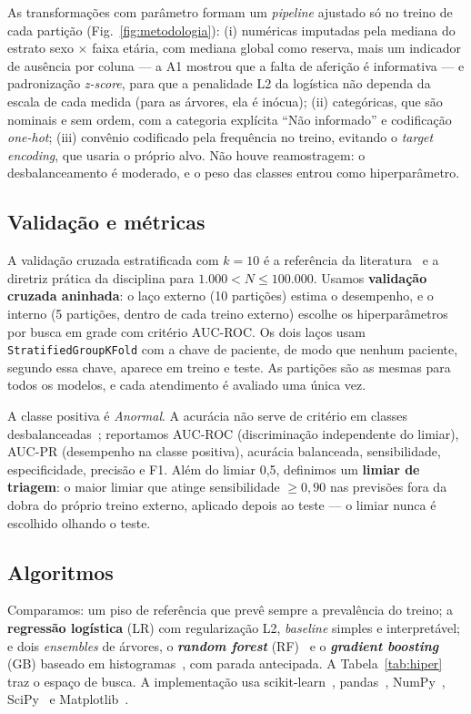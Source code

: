 \documentclass[conference,a4paper]{IEEEtran}
\begin{document}
As transformações com parâmetro formam um \textit{pipeline} ajustado só no treino de cada partição (Fig.~\ref{fig:metodologia}): (i) numéricas imputadas pela mediana do estrato sexo $\times$ faixa etária, com mediana global como reserva, mais um indicador de ausência por coluna --- a A1 mostrou que a falta de aferição é informativa --- e padronização \textit{z-score}, para que a penalidade L2 da logística não dependa da escala de cada medida (para as árvores, ela é inócua); (ii) categóricas, que são nominais e sem ordem, com a categoria explícita ``Não informado'' e codificação \textit{one-hot}; (iii) convênio codificado pela frequência no treino, evitando o \textit{target encoding}, que usaria o próprio alvo. Não houve reamostragem: o desbalanceamento é moderado, e o peso das classes entrou como hiperparâmetro.

\subsection{Validação e métricas}

A validação cruzada estratificada com $k=10$ é a referência da literatura~\cite{kohavi1995} e a diretriz prática da disciplina para $1.000 < N \leq 100.000$. Usamos \textbf{validação cruzada aninhada}: o laço externo (10 partições) estima o desempenho, e o interno (5 partições, dentro de cada treino externo) escolhe os hiperparâmetros por busca em grade com critério AUC-ROC. Os dois laços usam \texttt{StratifiedGroupKFold} com a chave de paciente, de modo que nenhum paciente, segundo essa chave, aparece em treino e teste. As partições são as mesmas para todos os modelos, e cada atendimento é avaliado uma única vez.

A classe positiva é \emph{Anormal}. A acurácia não serve de critério em classes desbalanceadas~\cite{faceli2021}; reportamos AUC-ROC (discriminação independente do limiar), AUC-PR (desempenho na classe positiva), acurácia balanceada, sensibilidade, especificidade, precisão e F1. Além do limiar 0,5, definimos um \textbf{limiar de triagem}: o maior limiar que atinge sensibilidade $\geq0{,}90$ nas previsões fora da dobra do próprio treino externo, aplicado depois ao teste --- o limiar nunca é escolhido olhando o teste.

\subsection{Algoritmos}

Comparamos: um piso de referência que prevê sempre a prevalência do treino; a \textbf{regressão logística} (LR) com regularização L2, \textit{baseline} simples e interpretável; e dois \textit{ensembles} de árvores, o \textbf{\textit{random forest}} (RF)~\cite{breiman2001} e o \textbf{\textit{gradient boosting}} (GB) baseado em histogramas~\cite{friedman2001,ke2017}, com parada antecipada. A Tabela~\ref{tab:hiper} traz o espaço de busca. A implementação usa scikit-learn~\cite{pedregosa2011}, pandas~\cite{mckinney2010}, NumPy~\cite{harris2020}, SciPy~\cite{virtanen2020} e Matplotlib~\cite{hunter2007}.
\end{document}
